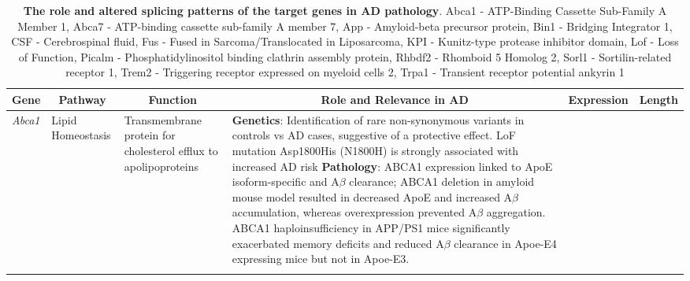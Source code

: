 \begin{changemargin}{1.5cm}
	\begin{landscape}
		\small %
		\setlength\tabcolsep{2pt} %
		\renewcommand{\arraystretch}{1}
		\begin{longtable}[c]{p{1cm}p{2cm}p{4cm}p{16cm}p{1cm}p{1cm}}
			\caption[The role and altered splicing patterns of the target genes in AD pathology]%
			{\textbf{The role and altered splicing patterns of the target genes in AD pathology}. Abca1 - ATP-Binding Cassette Sub-Family A Member 1, Abca7 - ATP-binding cassette sub-family A member 7, App - Amyloid-beta precursor protein, Bin1 - Bridging Integrator 1, CSF - Cerebrospinal fluid,  Fus - Fused in Sarcoma/Translocated in Liposarcoma, KPI - Kunitz-type protease inhibitor domain, Lof - Loss of Function, Picalm - Phosphatidylinositol binding clathrin assembly protein, Rhbdf2 - Rhomboid 5 Homolog 2, Sorl1 - Sortilin-related receptor 1, Trem2 - Triggering receptor expressed on myeloid cells 2, Trpa1 - Transient receptor potential ankyrin 1}
			\label{tab: TargetGenes_LitReview}\\
			
			\toprule
			\multicolumn{1}{c}{Gene} &
			\multicolumn{1}{c}{Pathway} &
			\multicolumn{1}{c}{Function} &
			\multicolumn{1}{c}{Role and Relevance in AD} &
			\multicolumn{1}{c}{Expression} & 
			\multicolumn{1}{c}{Length} \\* \midrule
			\endfirsthead	%
			\endhead%
			\bottomrule
			\endfoot%
			\endlastfoot%
			\centering \textit{Abca1} &
			\centering Lipid Homeostasis  &
			\centering Transmembrane protein for cholesterol efflux to apolipoproteins \newline &
			\tabitem\textbf{Genetics}: Identification of rare non-synonymous variants in controls vs AD cases, suggestive of a protective effect. LoF mutation Asp1800His (N1800H) is strongly associated with increased AD risk \cite{Nordestgaard2015} \newline
			\tabitem \textbf{Pathology}: ABCA1 expression linked to ApoE isoform-specific and A$\beta$ clearance; ABCA1 deletion in amyloid mouse model resulted in decreased ApoE and increased A$\beta$ accumulation, whereas overexpression prevented A$\beta$ aggregation\cite{Koldamova2014}. ABCA1 haploinsufficiency in APP/PS1 mice significantly exacerbated memory deficits and reduced A$\beta$ clearance in Apoe-E4 expressing mice but not in Apoe-E3\cite{Fitz2012}.\ \\
			\hdashline[0.5pt/5pt]
			

\end{longtable}
\end{landscape}
\end{changemargin}

